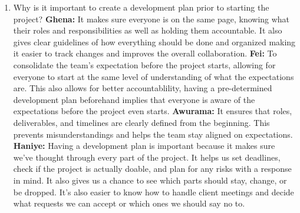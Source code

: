 \documentclass{article}
\begin{document}
\begin{enumerate}
    \item Why is it important to create a development plan prior to starting the
    project?
    \textbf{Ghena: } It makes sure everyone is on the same page, knowing what their roles and responsibilities as well as holding them accountable. It also gives clear guidelines of how everything should be done and organized making it easier to track changes and improves the overall collaboration.
    \textbf{Fei:} To consolidate the team’s expectation before the project starts, allowing for everyone to start at the same level of understanding of what the expectations are. This also allows for better accountablility, having a pre-determined development plan beforehand implies that everyone is aware of the expectations before the project even starts.
    \textbf{Awurama:} It ensures that roles, deliverables, and timelines are clearly defined 
    from the beginning. This prevents misunderstandings and helps the team stay aligned 
    on expectations.
\textbf{Haniye:} Having a development plan is important because it makes sure we’ve thought through every part of the project. It helps us set deadlines, check if the project is actually doable, and plan for any risks with a response in mind. It also gives us a chance to see which parts should stay, change, or be dropped. It’s also easier to know how to handle client meetings and decide what requests we can accept or which ones we should say no to.


\end{enumerate}
\end{document}
